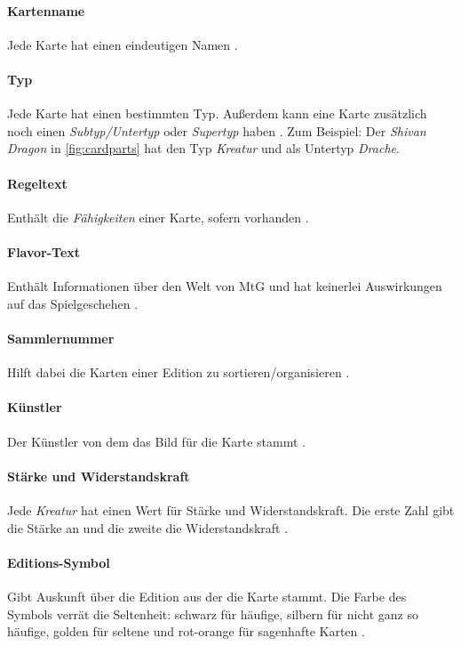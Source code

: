 \paragraph{Kartenname} 
Jede Karte hat einen eindeutigen Namen \cite{rulebook:2013}.

\paragraph{Typ}
Jede Karte hat einen bestimmten Typ. Außerdem kann eine Karte zusätzlich noch einen \emph{Subtyp/Untertyp} oder \emph{Supertyp} haben  \cite{rulebook:2013}. Zum Beispiel: Der \emph{Shivan Dragon} in \autoref{fig:cardparts} hat den Typ \emph{Kreatur} und als Untertyp \emph{Drache}.

\paragraph{Regeltext}
Enthält die \emph{Fähigkeiten} einer Karte, sofern vorhanden \cite{rulebook:2013}.

\paragraph{Flavor-Text}
Enthält Informationen über den Welt von \ac{MtG} und hat keinerlei Auswirkungen auf das Spielgeschehen \cite{rulebook:2013}.

\paragraph{Sammlernummer}
Hilft dabei die Karten einer Edition zu sortieren/organisieren  \cite{rulebook:2013}.

\paragraph{Künstler}
Der Künstler von dem das Bild für die Karte stammt  \cite{rulebook:2013}.

\paragraph{Stärke und Widerstandskraft}
Jede \emph{Kreatur} hat einen Wert für Stärke und Widerstandskraft. Die erste Zahl gibt die Stärke an und die zweite die Widerstandskraft  \cite{rulebook:2013}.

\paragraph{Editions-Symbol}
Gibt Auskunft über die Edition aus der die Karte stammt. Die Farbe des Symbols verrät die Seltenheit: schwarz für häufige, silbern für nicht ganz so häufige, golden für seltene und rot-orange für sagenhafte Karten \cite{rulebook:2013}.

